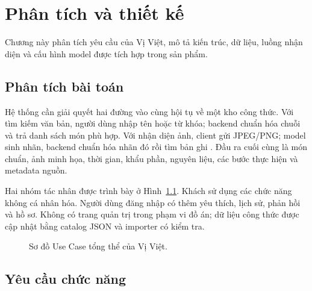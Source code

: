 \chapter{Phân tích và thiết kế}
\label{ch:thietke}

\begin{muctieu}
Chương này phân tích yêu cầu của Vị Việt, mô tả kiến trúc, dữ liệu, luồng
nhận diện và cấu hình model được tích hợp trong sản phẩm.
\end{muctieu}

\section{Phân tích bài toán}

Hệ thống cần giải quyết hai đường vào cùng hội tụ về một kho công thức. Với
tìm kiếm văn bản, người dùng nhập tên hoặc từ khóa; backend chuẩn hóa chuỗi
và trả danh sách món phù hợp. Với nhận diện ảnh, client gửi JPEG/PNG; model
sinh nhãn, backend chuẩn hóa nhãn đó rồi tìm bản ghi . Đầu ra
cuối cùng là món chuẩn, ảnh minh họa, thời gian, khẩu phần, nguyên liệu, các
bước thực hiện và metadata nguồn.

Hai nhóm tác nhân được trình bày ở Hình~\ref{fig:usecase}. Khách sử dụng các
chức năng không cá nhân hóa. Người dùng đăng nhập có thêm yêu thích, lịch sử,
phản hồi và hồ sơ. Không có trang quản trị trong phạm vi đồ án; dữ liệu công
thức được cập nhật bằng catalog JSON và importer có kiểm tra.

\begin{figure}[htbp]
\centering
\resizebox{0.94\textwidth}{!}{}
\caption{Sơ đồ Use Case tổng thể của Vị Việt.}
\label{fig:usecase}
\end{figure}

\section{Yêu cầu chức năng}

